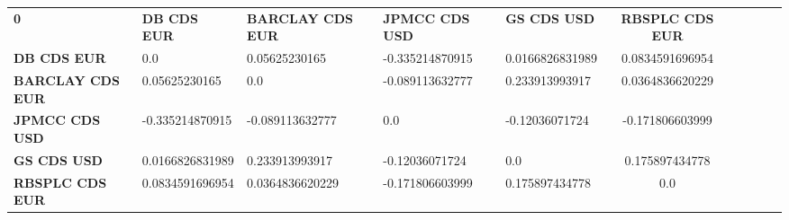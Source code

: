 \begin{tabular}{|l|l|l|l|l|c|c|c|c|c|}
\hline
\textbf{0} & \textbf{DB CDS EUR} & \textbf{BARCLAY CDS EUR} & \textbf{JPMCC CDS USD} & \textbf{GS CDS USD} & \textbf{RBSPLC CDS EUR}\\\hhline{|=|=|=|=|=|=|}
\textbf{DB CDS EUR} & 0.0 & 0.05625230165 & -0.335214870915 & 0.0166826831989 & 0.0834591696954\\
\textbf{BARCLAY CDS EUR} & 0.05625230165 & 0.0 & -0.089113632777 & 0.233913993917 & 0.0364836620229\\
\textbf{JPMCC CDS USD} & -0.335214870915 & -0.089113632777 & 0.0 & -0.12036071724 & -0.171806603999\\
\textbf{GS CDS USD} & 0.0166826831989 & 0.233913993917 & -0.12036071724 & 0.0 & 0.175897434778\\
\textbf{RBSPLC CDS EUR} & 0.0834591696954 & 0.0364836620229 & -0.171806603999 & 0.175897434778 & 0.0\\
\hline
\end{tabular}
